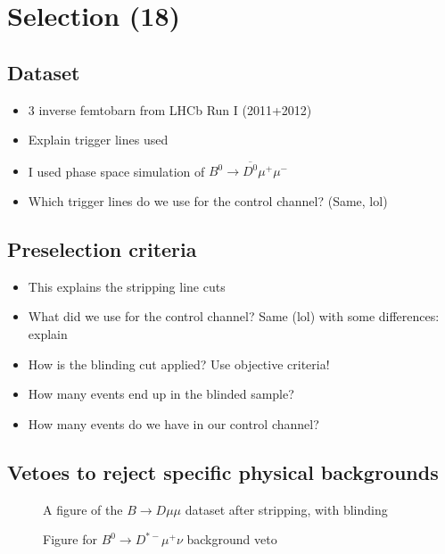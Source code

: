 \chapter{Selection (18)}

\section{Dataset}

\begin{itemize}
  \item 3 inverse femtobarn from LHCb Run I (2011+2012)
  \item Explain trigger lines used
  \item I used phase space simulation of $B^0\to\overline{D^0}μ^+μ^-$
  \item Which trigger lines do we use for the control channel? (Same, lol)
\end{itemize}

\section{Preselection criteria}

\begin{itemize}
  \item This explains the stripping line cuts
  \item What did we use for the control channel? Same (lol) with some differences: explain
  \item How is the blinding cut applied? Use objective criteria!
  \item How many events end up in the blinded sample?
  \item How many events do we have in our control channel?
\end{itemize}

\section{Vetoes to reject specific physical backgrounds}

\begin{figure}
  \centering
  \caption{A figure of the $B\to Dμμ$ dataset after stripping, with blinding}
\end{figure}

\begin{figure}
  \centering
  \caption{Figure for $B^0\to D^{*-}μ^+ν$ background veto}
\end{figure}

